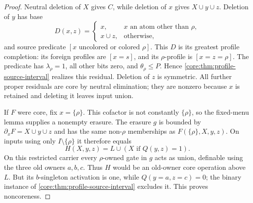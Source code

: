 \begin{proof}
Neutral deletion of $X$ gives $C$, while deletion of $x$ gives
$X\cup y\cup z$. Deletion of $y$ has base
\[
 D(x,z)=\begin{cases}
 x,&x\text{ an atom other than }\rho,\\
 x\cup z,&\text{otherwise},
 \end{cases}
\]
and source predicate $[x\text{ uncolored or colored }\rho]$.
This $D$ is its greatest profile completion: its foreign profiles are
$[x=s]$, and its $\rho$-profile is $[x=z=\rho]$.
The predicate has $\lambda_\rho=1$, all other bits zero, and
$\theta_\rho\leq P$. Hence \cref{core:thm:profile-source-interval}
realizes this residual. Deletion of $z$ is symmetric. All further
proper residuals are core by neutral elimination; they are nonzero
because $x$ is retained and deleting it leaves input union.

If $F$ were core, fix $x=\{\rho\}$. This cofactor is not constantly
$\{\rho\}$, so the fixed-menu lemma supplies a nonempty erasure.
The erasure $g$ is bounded by $\partial_xF=X\cup y\cup z$ and
has the same non-$\rho$ memberships as $F(\{\rho\},X,y,z)$.
On inputs using only $I\setminus\{\rho\}$ it therefore equals
\[
 H(X,y,z)=L\cup(X\text{ if }Q(y,z)=1).
\]
On this restricted carrier every $\rho$-owned gate in $g$ acts as
union, definable using the three old owners $a,b,c$.
Thus $H$ would be an old-owner core operation above $L$.
But its $b$-singleton activation is one, while $Q(y=a,z=c)=0$;
the binary instance of \cref{core:thm:profile-source-interval}
excludes it. This proves noncoreness.
\end{proof}
